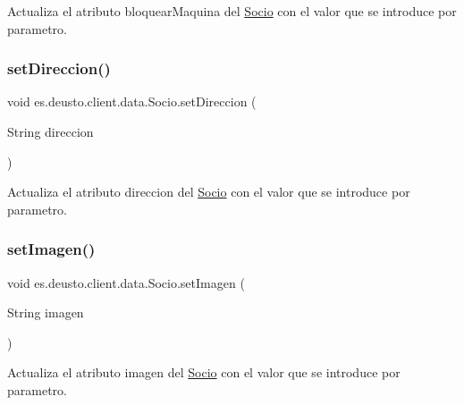 Actualiza el atributo bloquear\+Maquina del \mbox{\hyperlink{classes_1_1deusto_1_1client_1_1data_1_1_socio}{Socio}} con el valor que se introduce por parametro. \mbox{\label{classes_1_1deusto_1_1client_1_1data_1_1_socio_ae1c6473781bee6e8b92bb66af901f7da}} 
\subsubsection{\texorpdfstring{setDireccion()}{setDireccion()}}
{\footnotesize\ttfamily void es.\+deusto.\+client.\+data.\+Socio.\+set\+Direccion (\begin{DoxyParamCaption}\item[{String}]{direccion }\end{DoxyParamCaption})}

Actualiza el atributo direccion del \mbox{\hyperlink{classes_1_1deusto_1_1client_1_1data_1_1_socio}{Socio}} con el valor que se introduce por parametro. \mbox{\label{classes_1_1deusto_1_1client_1_1data_1_1_socio_a45342e0c19a78646c1f2aa437471306b}} 
\subsubsection{\texorpdfstring{setImagen()}{setImagen()}}
{\footnotesize\ttfamily void es.\+deusto.\+client.\+data.\+Socio.\+set\+Imagen (\begin{DoxyParamCaption}\item[{String}]{imagen }\end{DoxyParamCaption})}

Actualiza el atributo imagen del \mbox{\hyperlink{classes_1_1deusto_1_1client_1_1data_1_1_socio}{Socio}} con el valor que se introduce por parametro. \mbox{\label{classes_1_1deusto_1_1client_1_1data_1_1_socio_a057a2d71d0942835f9741366783ac60f}} 
